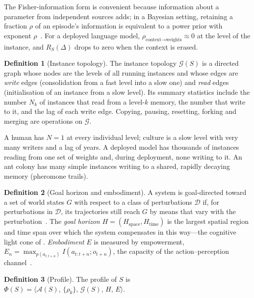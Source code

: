 \documentclass[11pt]{article}
\theoremstyle{plain}
\theoremstyle{definition}
\newtheorem{definition}{Definition}
\theoremstyle{remark}
\begin{document}
The Fisher-information form is convenient because information about a parameter from independent sources adds; in a Bayesian setting, retaining a fraction $\rho$ of an episode's information is equivalent to a power prior with exponent $\rho$~\citep{ibrahim2000power}. For a deployed language model, $\rho_{\text{context}\to\text{weights}}\approx0$ at the level of the instance, and $R_S(\Delta)$ drops to zero when the context is erased.

\begin{definition}[Instance topology]
The instance topology $\mathcal{G}(S)$ is a directed graph whose nodes are the levels of all running instances and whose edges are \emph{write} edges (consolidation from a fast level into a slow one) and \emph{read} edges (initialisation of an instance from a slow level). Its summary statistics include the number $N_k$ of instances that read from a level-$k$ memory, the number that write to it, and the lag of each write edge. Copying, pausing, resetting, forking and merging are operations on $\mathcal{G}$.
\end{definition}

A human has $N=1$ at every individual level; culture is a slow level with very many writers and a lag of years. A deployed model has thousands of instances reading from one set of weights and, during deployment, none writing to it. An ant colony has many simple instances writing to a shared, rapidly decaying memory (pheromone trails).

\begin{definition}[Goal horizon and embodiment]
A system is goal-directed toward a set of world states $G$ with respect to a class of perturbations $\mathcal{D}$ if, for perturbations in $\mathcal{D}$, its trajectories still reach $G$ by means that vary with the perturbation~\citep{james1890principles,rosenblueth1943behavior}. The \emph{goal horizon} $H=(H_{\mathrm{space}},H_{\mathrm{time}})$ is the largest spatial region and time span over which the system compensates in this way---the cognitive light cone of \citet{levin2019computational}. \emph{Embodiment} $E$ is measured by empowerment, $E_n=\max_{p(a_{t:t+n})} I(a_{t:t+n};o_{t+n})$, the capacity of the action--perception channel~\citep{klyubin2005empowerment}.
\end{definition}

\begin{definition}[Profile]
The profile of $S$ is $\Phi(S)=\big\langle\mathcal{A}(S),\,\{\rho_k\},\,\mathcal{G}(S),\,H,\,E\big\rangle$.
\end{definition}
\end{document}
